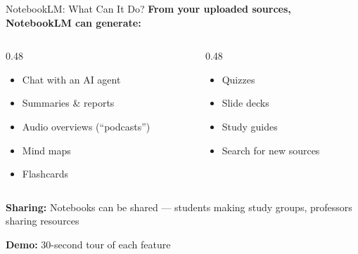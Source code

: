 \documentclass[aspectratio=169]{beamer}
\begin{document}
\begin{frame}{NotebookLM: What Can It Do?}
    \textbf{From your uploaded sources, NotebookLM can generate:}

    \vspace{0.8em}
    \begin{columns}[T]
    \begin{column}{0.48\textwidth}
        \begin{itemize}
            \item Chat with an AI agent
            \item Summaries \& reports
            \item Audio overviews (``podcasts'')
            \item Mind maps
            \item Flashcards
        \end{itemize}
    \end{column}
    \begin{column}{0.48\textwidth}
        \begin{itemize}
            \item Quizzes
            \item Slide decks
            \item Study guides
            \item Search for new sources
        \end{itemize}
    \end{column}
    \end{columns}

    \vspace{1em}
    \textbf{Sharing:} Notebooks can be shared --- students making study groups, professors sharing resources

    \vspace{0.8em}
    \textbf{Demo:} 30-second tour of each feature
\end{frame}
\end{document}
